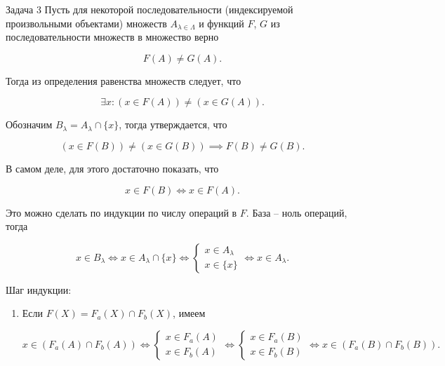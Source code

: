 \documentclass{article}
\begin{document}
	\begin{section}{Задача 3}
		Пусть для некоторой последовательности (индексируемой произвольными объектами) множеств $A_{\lambda \in \Lambda}$ и функций $F$, $G$ из последовательности множеств в множество верно

		\begin{equation*}
			F(A) \ne G(A).
		\end{equation*}

		Тогда из определения равенства множеств следует, что

		\begin{equation*}
			\exists x: (x \in F(A)) \ne (x \in G(A)).
		\end{equation*}

		Обозначим $B_\lambda = A_\lambda \cap \{x\}$, тогда утверждается, что

		\begin{equation*}
			(x \in F(B)) \ne (x \in G(B)) \implies F(B) \ne G(B).
		\end{equation*}

		В самом деле, для этого достаточно показать, что

		\begin{equation*}
			x \in F(B) \iff x \in F(A).
		\end{equation*}

		Это можно сделать по индукции по числу операций в $F$. База -- ноль операций, тогда

		\begin{equation*}
			x \in B_\lambda
			\iff
			x \in A_\lambda \cap \{x\}
			\iff
			\begin{cases}
				x \in A_\lambda \\
				x \in \{x\}
			\end{cases}
			\iff
			x \in A_\lambda.
		\end{equation*}

		Шаг индукции:

		\begin{enumerate}
			\item Если $F(X) = F_a(X) \cap F_b(X)$, имеем

			\begin{equation*}
				x \in (F_a(A) \cap F_b(A))
				\iff
				\begin{cases}
					x \in F_a(A) \\
					x \in F_b(A)
				\end{cases}
				\iff
				\begin{cases}
					x \in F_a(B) \\
					x \in F_b(B)
				\end{cases}
				\iff
				x \in (F_a(B) \cap F_b(B)).
			\end{equation*}


\end{enumerate}
\end{section}
\end{document}
